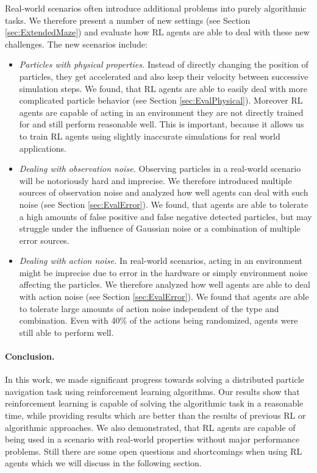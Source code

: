 Real-world scenarios often introduce additional problems into purely algorithmic tasks. We therefore present a number of new settings (see Section \ref{sec:ExtendedMaze}) and evaluate how RL agents are able to deal with these new challenges. The new scenarios include: 
\begin{itemize}
    \item \textit{Particles with physical properties.} Instead of directly changing the position of particles, they get accelerated and also keep their velocity between successive simulation steps. We found, that RL agents are able to easily deal with more complicated particle behavior (see Section \ref{sec:EvalPhysical}). Moreover RL agents are capable of acting in an environment they are not directly trained for and still perform reasonable well. This is important, because it allows us to train RL agents using slightly inaccurate simulations for real world applications.
    \item \textit{Dealing with observation noise.} Observing particles in a real-world scenario will be notoriously hard and imprecise. We therefore introduced multiple sources of observation noise and analyzed how well agents can deal with such noise (see Section \ref{sec:EvalError}). We found, that agents are able to tolerate a high amounts of false positive and false negative detected particles, but may struggle under the influence of Gaussian noise or a combination of multiple error sources.
    \item \textit{Dealing with action noise.} In real-world scenarios, acting in an environment might be imprecise due to error in the hardware or simply environment noise affecting the particles. We therefore analyzed how well agents are able to deal with action noise (see Section \ref{sec:EvalError}). We found that agents are able to tolerate large amounts of action noise independent of the type and combination. Even with 40\% of the actions being randomized, agents were still able to perform well.
\end{itemize}

\paragraph{Conclusion.} In this work, we made significant progress towards solving a distributed particle navigation task using reinforcement learning algorithms. Our results show that reinforcement learning is capable of solving the algorithmic task in a reasonable time, while providing results which are better than the results of previous RL or algorithmic approaches. We also demonstrated, that RL agents are capable of being used in a scenario with real-world properties without major performance problems. Still there are some open questions and shortcomings when using RL agents which we will discuss in the following section.  

